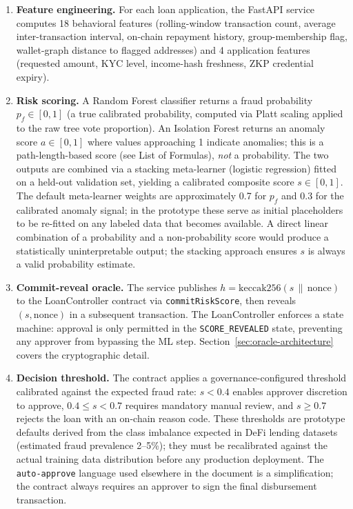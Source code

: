 \documentclass[12pt, a4paper]{report}
\begin{document}
\begin{enumerate}[noitemsep]
\item \textbf{Feature engineering.} For each loan application, the FastAPI service computes 18 behavioral features (rolling-window transaction count, average inter-transaction interval, on-chain repayment history, group-membership flag, wallet-graph distance to flagged addresses) and 4 application features (requested amount, KYC level, income-hash freshness, ZKP credential expiry).
\item \textbf{Risk scoring.} A Random Forest classifier returns a fraud probability $p_f \in [0, 1]$ (a true calibrated probability, computed via Platt scaling applied to the raw tree vote proportion). An Isolation Forest returns an anomaly score $a \in [0, 1]$ where values approaching 1 indicate anomalies; this is a path-length-based score (see List of Formulas), \textit{not} a probability. The two outputs are combined via a stacking meta-learner (logistic regression) fitted on a held-out validation set, yielding a calibrated composite score $s \in [0, 1]$. The default meta-learner weights are approximately 0.7 for $p_f$ and 0.3 for the calibrated anomaly signal; in the prototype these serve as initial placeholders to be re-fitted on any labeled data that becomes available. A direct linear combination of a probability and a non-probability score would produce a statistically uninterpretable output; the stacking approach ensures $s$ is always a valid probability estimate.
\item \textbf{Commit-reveal oracle.} The service publishes \(h = \mathrm{keccak256}(s \,\|\, \text{nonce})\) to the LoanController contract via \texttt{commitRiskScore}, then reveals $(s, \text{nonce})$ in a subsequent transaction. The LoanController enforces a state machine: approval is only permitted in the \texttt{SCORE\_REVEALED} state, preventing any approver from bypassing the ML step. Section~\ref{sec:oracle-architecture} covers the cryptographic detail.
\item \textbf{Decision threshold.} The contract applies a governance-configured threshold calibrated against the expected fraud rate: $s < 0.4$ enables approver discretion to approve, $0.4 \le s < 0.7$ requires mandatory manual review, and $s \ge 0.7$ rejects the loan with an on-chain reason code. These thresholds are prototype defaults derived from the class imbalance expected in DeFi lending datasets (estimated fraud prevalence 2--5\%); they must be recalibrated against the actual training data distribution before any production deployment. The \texttt{auto-approve} language used elsewhere in the document is a simplification; the contract always requires an approver to sign the final disbursement transaction.
\end{enumerate}
\end{document}
